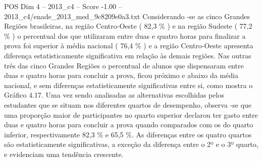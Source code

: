 \begin{textsample}{POS Dim 4 – 2013\_c4 – Score -1.00 – 2013\_c4/enade\_2013\_med\_9c8209e0a3.txt}
Considerando -se as cinco Grandes Regiões brasileiras, na região Centro-Oeste ( 82,3 \% ) e na região Sudeste ( 77,2 \% ) o percentual dos que utilizaram entre duas e quatro horas para finalizar a prova foi superior à média nacional ( 76,4 \% ) e a região Centro-Oeste apresenta diferença estatisticamente significativa em relação às demais regiões.
Nas outras três das cinco Grandes Regiões o percentual de alunos que dispensaram entre duas e quatro horas para concluir a prova, ficou próximo e abaixo da média nacional, e sem diferenças estatisticamente significativas entre si, como mostra o Gráfico 4.17.
Uma vez sendo analisadas as alternativas escolhidas pelos estudantes que se situam nos diferentes quartos de desempenho, observa -se que uma proporção maior de participantes no quarto superior declarou ter gasto entre duas e quatro horas para concluir a prova quando comparados com os do quarto inferior, respectivamente 82,3 \% e 65,5 \%.
As diferenças entre os quatro quartos são estatisticamente significativas, a exceção da diferença entre o 2º e o 3º quarto, e evidenciam uma tendência crescente.

\end{textsample}
